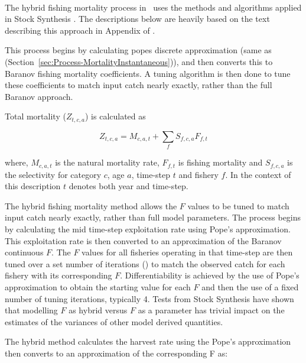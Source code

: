 \paragraph{}\label{sec:Process-MortalityHybrid} 

The hybrid fishing mortality process in \CNAME\ uses the methods and algorithms applied in Stock Synthesis \citep{methot2013stock}. The descriptions below are heavily based on the text describing this approach in Appendix of \cite{methot2013stock}.

This process begins by calculating popes discrete approximation (same as  (Section~\ref{sec:Process-MortalityInstantaneous})), and then converts this to Baranov fishing mortality coefficients. A tuning algorithm is then done to tune these coefficients to match input catch nearly exactly, rather than the full Baranov approach.

Total mortality (\(Z_{t,c,a}\)) is calculated as

\begin{equation*}
	Z_{t,c,a} = M_{c,a,t} + \sum\limits_{f} S_{f,c,a} F_{f,t}
\end{equation*}

where, \( M_{c,a,t}\) is the natural mortality rate, \( F_{f,t}\) is fishing mortality and \(S_{f,c,a}\) is the selectivity for category \(c\), age \(a\), time-step \(t\) and fishery \(f\). In the context of this description \(t\) denotes both year and time-step.

The hybrid fishing mortality method allows the \(F\) values to be tuned to match input catch nearly exactly, rather than full model parameters. The process begins by calculating the mid time-step exploitation rate using Pope’s approximation. This exploitation rate is then converted to an approximation of the Baranov continuous \(F\). The \(F\) values for all fisheries operating in that time-step are then tuned over a set number of iterations () to match the observed catch for each fishery with its corresponding \(F\). Differentiability is achieved by the use of Pope's approximation to obtain the starting value for each \(F\) and then the use of a fixed number of tuning iterations, typically 4. Tests from Stock Synthesis have shown that modelling \(F\) as hybrid versus \(F\) as a parameter has trivial impact on the estimates of the variances of other model derived quantities. 

The hybrid method calculates the harvest rate using the Pope's approximation then converts to an approximation of the corresponding F as:

